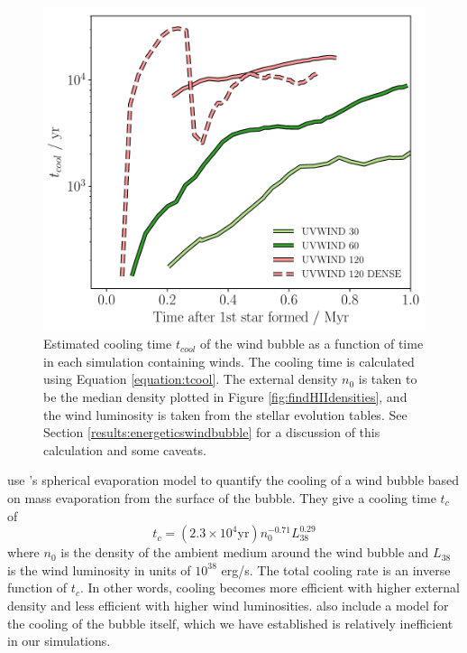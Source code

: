 \documentclass[a4paper,fleqn,usenatbib]{mnras}
\begin{document}
\begin{figure}
\includegraphics[width=0.98\columnwidth]{plots/fig9a.pdf}
\caption{Estimated cooling time $t_{cool}$ of the wind bubble as a function of time in each simulation containing winds. The cooling time is calculated using Equation \ref{equation:tcool}. The external density $n_0$ is taken to be the median density plotted in Figure \ref{fig:findHIIdensities}, and the wind luminosity is taken from the stellar evolution tables. See Section \ref{results:energeticswindbubble} for a discussion of this calculation and some caveats.}
\label{fig:coolingtimes}
\end{figure}

\cite{MacLow1988} use \cite{Cowie1977}'s spherical evaporation model to quantify the cooling of a wind bubble based on mass evaporation from the surface of the bubble. They give a cooling time $t_c$ of
\begin{equation}
t_c = (2.3 \times 10^4 \mathrm{yr}) n_0^{-0.71} L_{38}^{0.29}
\label{equation:tcool}
\end{equation}
where $n_0$ is the density of the ambient medium around the wind bubble and $L_{38}$ is the wind luminosity in units of $10^{38}$ erg/s. The total cooling rate is an inverse function of $t_c$. In other words, cooling becomes more efficient with higher external density and less efficient with higher wind luminosities. \cite{MacLow1988} also include a model for the cooling of the bubble itself, which we have established is relatively inefficient in our simulations.
\end{document}
